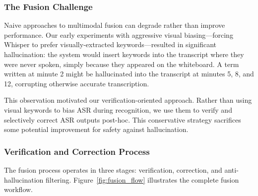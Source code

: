 \subsubsection{The Fusion Challenge}

Naive approaches to multimodal fusion can degrade rather than improve performance. Our early experiments with aggressive visual biasing---forcing Whisper to prefer visually-extracted keywords---resulted in significant hallucination: the system would insert keywords into the transcript where they were never spoken, simply because they appeared on the whiteboard. A term written at minute 2 might be hallucinated into the transcript at minutes 5, 8, and 12, corrupting otherwise accurate transcription.

This observation motivated our verification-oriented approach. Rather than using visual keywords to bias ASR during recognition, we use them to verify and selectively correct ASR outputs post-hoc. This conservative strategy sacrifices some potential improvement for safety against hallucination.

\subsubsection{Verification and Correction Process}

The fusion process operates in three stages: verification, correction, and anti-hallucination filtering. Figure~\ref{fig:fusion_flow} illustrates the complete fusion workflow.

